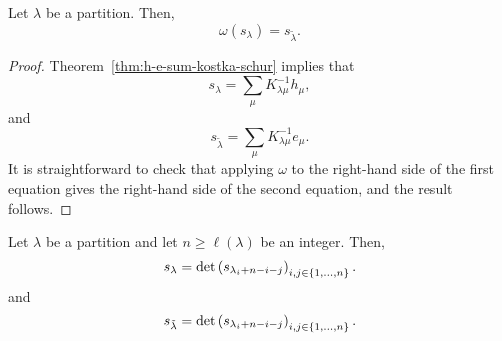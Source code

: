 \begin{theorem}
    Let \(\lambda\) be a partition.
    Then,
    \begin{equation}
        \omega(s_\lambda) = s_{\tilde\lambda}.
    \end{equation}
\end{theorem}

\begin{proof}
    Theorem~\ref{thm:h-e-sum-kostka-schur} implies that
    \begin{equation}
        s_\lambda = \sum_{\mu} K_{\lambda \mu}^{-1} h_\mu,
    \end{equation}
    and 
    \begin{equation}
        s_{\tilde\lambda} = \sum_{\mu} K_{\lambda \mu}^{-1} e_\mu.
    \end{equation}
    It is straightforward to check that applying \(\omega\) to the right-hand side of the first equation gives the right-hand side of the second equation, and the result follows.
\end{proof}

\begin{theorem} \label{thm:jacobi-trudi}
    Let \(\lambda\) be a partition and let \(n \geq \ell(\lambda)\) be an integer.
    Then,
    \begin{equation}
        s_\lambda = \det\left( s_{\lambda_i + n - i - j} \right)_{i, j \in \interval{n}}.
    \end{equation}
    and
    \begin{equation}
        s_{\tilde\lambda} = \det\left( s_{\lambda_i + n - i - j} \right)_{i, j \in \interval{n}}.
    \end{equation}
\end{theorem}

